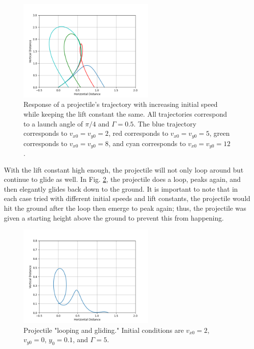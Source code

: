 \documentclass[12pt]{iopart} %
\begin{document}
\begin{figure}[h!tbp]
  \begin{center}
 \item[]\includegraphics[width=0.6\textwidth]{lift2.png}
  \caption{\label{fig:lift2}
  Response of a projectile's trajectory with increasing initial speed while keeping the lift constant the same.
  All trajectories correspond to a launch angle of $\pi/4$ and $\Gamma = 0.5$.
  The blue trajectory corresponds to $v_{x0} = v_{y0} = 2$, red corresponds to $v_{x0} = v_{y0} = 5$, green corresponds to $v_{x0} = v_{y0} = 8$, and cyan corresponds to $v_{x0} = v_{y0} = 12$.
  }
  \end{center}
\end{figure}

With the lift constant high enough, the projectile will not only loop around but continue to glide as well.
In Fig. \ref{fig:lift3}, the projectile does a loop, peaks again, and then elegantly glides back down to the ground.
It is important to note that in each case tried with different initial speeds and lift constants, the projectile would hit the ground after the loop then emerge to peak again; thus, the projectile was given a starting height above the ground to prevent this from happening.

\begin{figure}[h!tbp]
  \begin{center}
 \item[]\includegraphics[width=0.6\textwidth]{lift3.png}
  \caption{\label{fig:lift3}
  Projectile "looping and gliding."
  Initial conditions are $v_{x0} = 2$, $v_{y0} = 0$, $y_{0} = 0.1$, and $\Gamma = 5$.
  }
  \end{center}
\end{figure}
\end{document}
